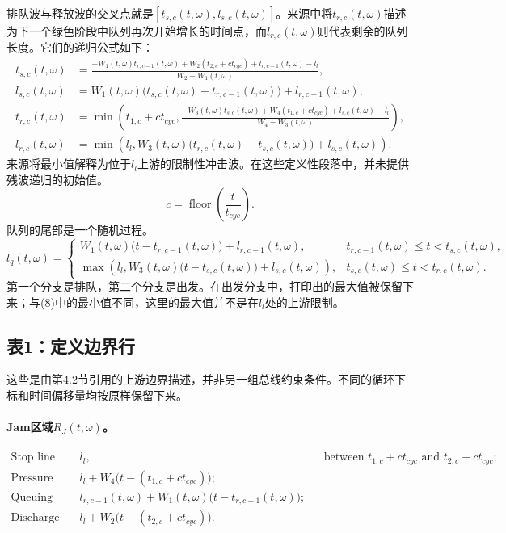 \documentclass{article}
\begin{document}
排队波与释放波的交叉点就是\([t_{s,c}(t,\omega),l_{s,c}(t,\omega)]\)。来源中将\(t_{r,c}(t,\omega)\)描述为下一个绿色阶段中队列再次开始增长的时间点，而\(l_{r,c}(t,\omega)\)则代表剩余的队列长度。它们的递归公式如下：
\begin{align}
t_{s,c}(t,\omega)
&=\frac{-W_1(t,\omega)t_{r,c-1}(t,\omega)
+W_2(t_{2,c}+ct_{cyc})+l_{r,c-1}(t,\omega)-l_l}
{W_2-W_1(t,\omega)}, \tag{5}\\
l_{s,c}(t,\omega)
&=W_1(t,\omega)\bigl(t_{s,c}(t,\omega)-t_{r,c-1}(t,\omega)\bigr)
+l_{r,c-1}(t,\omega), \tag{6}\\
t_{r,c}(t,\omega)
&=\min\left(
 t_{1,c}+ct_{cyc},
 \frac{-W_3(t,\omega)t_{s,c}(t,\omega)
 +W_4(t_{1,c}+ct_{cyc})+l_{s,c}(t,\omega)-l_l}
 {W_4-W_3(t,\omega)}
\right), \tag{7}\\
l_{r,c}(t,\omega)
&=\min\left(l_l,
W_3(t,\omega)\bigl(t_{r,c}(t,\omega)-t_{s,c}(t,\omega)\bigr)
+l_{s,c}(t,\omega)\right). \tag{8}
\end{align}
来源将最小值解释为位于\(l_l\)上游的限制性冲击波。在这些定义性段落中，并未提供残波递归的初始值。
\begin{equation}
c=\operatorname{floor}\left(\frac{t}{t_{cyc}}\right).
\tag{9}
\end{equation}
队列的尾部是一个随机过程。
\begin{equation}
l_q(t,\omega)=
\begin{cases}
W_1(t,\omega)\bigl(t-t_{r,c-1}(t,\omega)\bigr)+l_{r,c-1}(t,\omega),
& t_{r,c-1}(t,\omega)\leq t<t_{s,c}(t,\omega),\\[2mm]
\max\left(l_l,W_3(t,\omega)\bigl(t-t_{s,c}(t,\omega)\bigr)+l_{s,c}(t,\omega)\right),
& t_{s,c}(t,\omega)\leq t<t_{r,c}(t,\omega).
\end{cases}
\tag{10}
\end{equation}
第一个分支是排队，第二个分支是出发。在出发分支中，打印出的最大值被保留下来；与(8)中的最小值不同，这里的最大值并不是在\(l_l\)处的上游限制。

\subsection*{表1：定义边界行}
这些是由第4.2节引用的上游边界描述，并非另一组总线约束条件。不同的循环下标和时间偏移量均按原样保留下来。
\paragraph{Jam区域\(R_J(t,\omega)\)。}
\begin{align*}
\text{Stop line during red:}\quad &l_l,
&&\text{between }t_{1,c}+ct_{cyc}\text{ and }t_{2,c}+ct_{cyc};\\
\text{Pressure wave, if it exists:}\quad
&l_l+W_4\bigl(t-(t_{1,c}+ct_{cyc})\bigr);\\
\text{Queuing wave:}\quad
&l_{r,c-1}(t,\omega)+W_1(t,\omega)\bigl(t-t_{r,c-1}(t,\omega)\bigr);\\
\text{Discharge wave:}\quad
&l_l+W_2\bigl(t-(t_{2,c}+ct_{cyc})\bigr).
\end{align*}
\end{document}
